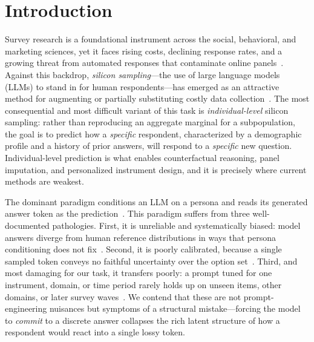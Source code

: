 \section{Introduction}
\label{sec:intro}

Survey research is a foundational instrument across the social, behavioral, and marketing sciences, yet it faces rising costs, declining response rates, and a growing threat from automated responses that contaminate online panels~\citep{westwood2025potential,camatarri2024predicting}. Against this backdrop, \emph{silicon sampling}---the use of large language models (LLMs) to stand in for human respondents---has emerged as an attractive method for augmenting or partially substituting costly data collection~\citep{sarstedt2024using,anthis2025social,bail2024generative}. The most consequential and most difficult variant of this task is \emph{individual-level} silicon sampling: rather than reproducing an aggregate marginal for a subpopulation, the goal is to predict how a \emph{specific} respondent, characterized by a demographic profile and a history of prior answers, will respond to a \emph{specific} new question. Individual-level prediction is what enables counterfactual reasoning, panel imputation, and personalized instrument design, and it is precisely where current methods are weakest.

The dominant paradigm conditions an LLM on a persona and reads its generated answer token as the prediction~\citep{sun2024random,hu2024quantifying,li2026personabased}. This paradigm suffers from three well-documented pathologies. First, it is unreliable and systematically biased: model answers diverge from human reference distributions in ways that persona conditioning does not fix~\citep{dominguezolmedo2023questioning,morocho2026assessing,taubenfeld2024systematic}. Second, it is poorly calibrated, because a single sampled token conveys no faithful uncertainty over the option set~\citep{geng2024survey}. Third, and most damaging for our task, it transfers poorly: a prompt tuned for one instrument, domain, or time period rarely holds up on unseen items, other domains, or later survey waves~\citep{ku2026silicon}. We contend that these are not prompt-engineering nuisances but symptoms of a structural mistake---forcing the model to \emph{commit} to a discrete answer collapses the rich latent structure of how a respondent would react into a single lossy token.

